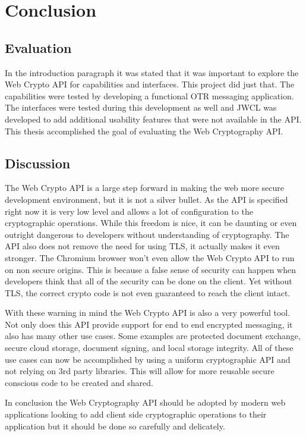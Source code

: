 \chapter{Conclusion}


\section{Evaluation}


In the introduction paragraph it was stated that it was important to explore the Web Crypto API for capabilities and interfaces. This project did just that. The capabilities were tested by developing a functional OTR messaging application. The interfaces were tested during this development as well and JWCL was developed to add additional usability features that were not available in the API. This thesis accomplished the goal of evaluating the Web Cryptography API.


\section{Discussion}


The Web Crypto API is a large step forward in making the web more secure development environment, but it is not a silver bullet. As the API is specified right now it is very low level and allows a lot of configuration to the cryptographic operations. While this freedom is nice, it can be daunting or even outright dangerous to developers without understanding of cryptography. The API also does not remove the need for using TLS, it actually makes it even stronger. The Chromium browser won’t even allow the Web Crypto API to run on non secure origins. This is because a false sense of security can happen when developers think that all of the security can be done on the client. Yet without TLS, the correct crypto code is not even guaranteed to reach the client intact. 


With these warning in mind the Web Crypto API is also a very powerful tool. Not only does this API provide support for end to end encrypted messaging, it also has many other use cases. Some examples are protected document exchange, secure cloud storage, document signing, and local storage integrity. All of these use cases can now be accomplished by using a uniform cryptographic API and not relying on 3rd party libraries. This will allow for more reusable secure conscious code to be created and shared. 


In conclusion the Web Cryptography API should be adopted by modern web applications looking to add client side cryptographic operations to their application but it should be done so carefully and delicately.

